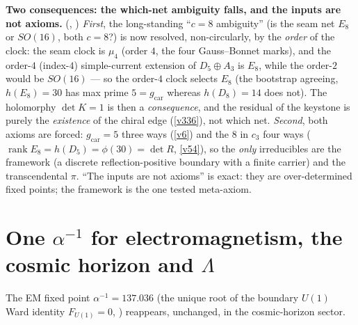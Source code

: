 \documentclass[11pt,a4paper]{article}
\newcommand{\cthree}{c_3}
\newcommand{\gcar}{g_{\mathrm{car}}}
\newcommand{\ainv}{\alpha^{-1}}
\begin{document}
\par\smallskip\noindent\textbf{Two consequences: the which-net ambiguity falls, and the inputs are not axioms.}
(, )
\emph{First}, the long-standing ``$c{=}8$ ambiguity'' (is the seam net $E_8$ or $SO(16)$, both $c{=}8$?) is now
resolved, non-circularly, by the \emph{order} of the clock: the seam clock is $\mu_4$ (order $4$, the four
Gauss--Bonnet marks), and the order-$4$ (index-$4$) simple-current extension of $D_5\!\oplus\!A_3$ is $E_8$, while
the order-$2$ would be $SO(16)$ --- so the order-$4$ clock selects $E_8$ (the bootstrap agreeing, $h(E_8){=}30$ has
max prime $5{=}\gcar$ whereas $h(D_8){=}14$ does not). The holomorphy $\det K{=}1$ is then a \emph{consequence}, and
the residual of the keystone is purely the \emph{existence} of the chiral edge (\vref{v336}), not which net.
\emph{Second}, both axioms are forced: $\gcar{=}5$ three ways (\vref{v6}) and the $8$ in $\cthree$ four ways
($\operatorname{rank}E_8=h(D_5)=\phi(30)=\det R$, \vref{v54}), so the \emph{only} irreducibles are the framework
(a discrete reflection-positive boundary with a finite carrier) and the transcendental $\pi$. ``The inputs are not
axioms'' is exact: they are over-determined fixed points; the framework is the one tested meta-axiom.

\section{One $\ainv$ for electromagnetism, the cosmic horizon and $\Lambda$}\label{sec:alpha}
The EM fixed point $\ainv=137.036$ (the unique root of the boundary $U(1)$ Ward identity $F_{U(1)}=0$,
) reappears, unchanged, in the cosmic-horizon sector.
\end{document}
